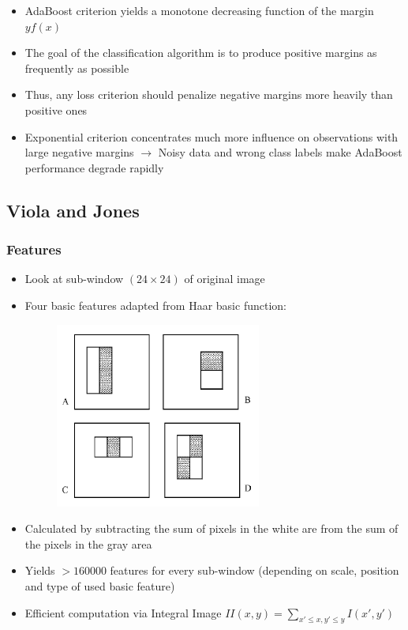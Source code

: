 \begin{itemize}
\begin{figure}[H]
        \end{figure}
    \item
        AdaBoost criterion yields a monotone decreasing function of the margin $yf(x)$
    \item
        The goal of the classification algorithm is to produce positive margins as frequently as possible
    \item
        Thus, any loss criterion should penalize negative margins more heavily than positive ones
    \item
        Exponential criterion concentrates much more influence on observations with large negative margins $\rightarrow$ Noisy data and wrong class labels make AdaBoost performance degrade rapidly
\end{itemize}
\subsection*{Viola and Jones}
\subsubsection*{Features}
\begin{itemize}
    \item
        Look at sub-window $(24 \times 24)$ of original image
    \item
        Four basic features adapted from Haar basic function:
        \begin{figure}[H]
            \centering
            \includegraphics[scale=0.7]{figures/viola1}
        \end{figure}
    \item
        Calculated by subtracting the sum of pixels in the white are from the sum of the pixels in the gray area
    \item
        Yields $> 160000$ features for every sub-window (depending on scale, position and type of used basic feature)
    \item
        Efficient computation via Integral Image $II(x, y) = \sum_{x'\leq x, y' \leq y} I(x',y')$
\end{itemize}

